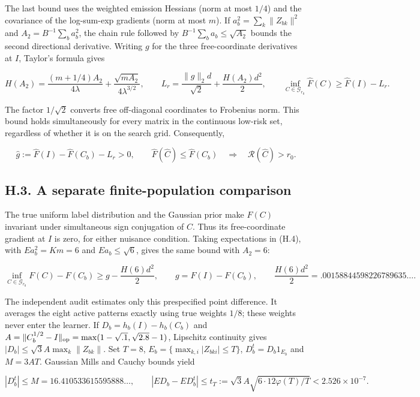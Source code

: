 \documentclass{article}
\begin{document}
The last bound uses the weighted emission Hessians (norm at most
\(1/4\)) and the covariance of the log-sum-exp gradients (norm at most
\(m\)). If \(a_b^2=\sum_k\|Z_{bk}\|^2\) and \(A_2=B^{-1}\sum_ba_b^2\),
the chain rule followed by \(B^{-1}\sum_b a_b\le\sqrt{A_2}\) bounds the
second directional derivative. Writing \(g\) for the three
free-coordinate derivatives at \(I\), Taylor's formula gives

\[
H(A_2)=\frac{(m+1/4)A_2}{4\lambda}
+\frac{\sqrt{mA_2}}{4\lambda^{3/2}},\qquad
L_r=\frac{\|g\|_2d}{\sqrt2}+\frac{H(A_2)d^2}{2},\qquad
\inf_{C\in\mathcal G_{r_0}}\widehat F(C)\ge\widehat F(I)-L_r.
\tag{H.5}
\]

The factor \(1/\sqrt2\) converts free off-diagonal coordinates to
Frobenius norm. This bound holds simultaneously for every matrix in the
continuous low-risk set, regardless of whether it is on the search grid.
Consequently,

\[
\widehat g:=\widehat F(I)-\widehat F(C_b)-L_r>0,\qquad
\widehat F(\widehat C)\le\widehat F(C_b)
\quad\Longrightarrow\quad \mathcal R(\widehat C)>r_0.
\tag{H.6}
\]

\subsection*{H.3. A separate finite-population
comparison}\label{h.3.-a-separate-finite-population-comparison}

The true uniform label distribution and the Gaussian prior make \(F(C)\)
invariant under simultaneous sign conjugation of \(C\). Thus its
free-coordinate gradient at \(I\) is zero, for either nuisance
condition. Taking expectations in (H.4), with \(Ea_b^2=Km=6\) and
\(Ea_b\le\sqrt6\), gives the same bound with \(A_2=6\):

\[
\inf_{C\in\mathcal G_{r_0}}F(C)-F(C_b)
\ge g-\frac{H(6)d^2}{2},\qquad
g=F(I)-F(C_b),\qquad \frac{H(6)d^2}{2}=.00158844598226789635\ldots.
\tag{H.7}
\]

The independent audit estimates only this prespecified point difference.
It averages the eight active patterns exactly using true weights
\(1/8\); these weights never enter the learner. If
\(D_b=h_b(I)-h_b(C_b)\) and
\(A=\|C_b^{1/2}-I\|_{\rm op}=\max(1-\sqrt{.1},\sqrt{2.8}-1)\), Lipschitz
continuity gives \(|D_b|\le\sqrt3 A\max_k\|Z_{bk}\|\). Set \(T=8\),
\(E_b=\{\max_{k,i}|Z_{bki}|\le T\}\), \(D_b^t=D_b1_{E_b}\) and
\(M=3AT\). Gaussian Mills and Cauchy bounds yield

\[
|D_b^t|\le M=16.410533615595888\ldots,\qquad
|ED_b-ED_b^t|\le t_T:=\sqrt3 A\sqrt{6\cdot12\varphi(T)/T}
<2.526\times10^{-7}.
\tag{H.8}
\]
\end{document}
